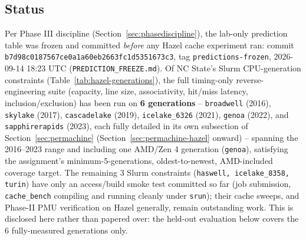 \documentclass{article}
\begin{document}
\subsection{Status}
Per Phase III discipline (Section~\ref{sec:phasediscipline}), the lab-only prediction table
was frozen and committed \emph{before} any Hazel cache experiment ran: commit
\texttt{b7d98c0187567ce0a1a60eb2663fc1d5351673c3}, tag \texttt{predictions-frozen},
2026-09-14 18:23 UTC (\texttt{PREDICTION\_FREEZE.md}). Of NC State's Slurm CPU-generation
constraints (Table~\ref{tab:hazel-generations}), the full timing-only reverse-engineering
suite (capacity, line size, associativity, hit/miss latency, inclusion/exclusion) has been
run on \textbf{6 generations} -- \texttt{broadwell} (2016), \texttt{skylake} (2017),
\texttt{cascadelake} (2019), \texttt{icelake\_6326} (2021), \texttt{genoa} (2022), and
\texttt{sapphirerapids} (2023), each fully detailed in its own subsection of
Section~\ref{sec:permachine} (Section~\ref{sec:permachine-hazel} onward) -- spanning the
2016--2023 range and including one AMD/Zen 4 generation (\texttt{genoa}), satisfying the
assignment's minimum-5-generations, oldest-to-newest, AMD-included coverage target. The
remaining 3 Slurm constraints (\texttt{haswell, icelake\_8358, turin}) have only an
access/build smoke test committed so far (job submission, \texttt{cache\_bench} compiling
and running cleanly under \texttt{srun}); their cache sweeps, and Phase-II PMU verification
on Hazel generally, remain outstanding work. This is disclosed here rather than papered
over: the held-out evaluation below covers the 6 fully-measured generations only.
\end{document}
